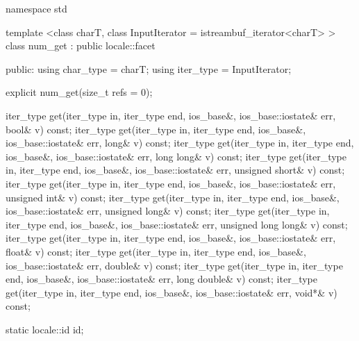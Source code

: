 %
\begin{codeblock}
namespace std {
  template <class charT, class InputIterator = istreambuf_iterator<charT> >
  class num_get : public locale::facet {
  public:
    using char_type = charT;
    using iter_type = InputIterator;

    explicit num_get(size_t refs = 0);

    iter_type get(iter_type in, iter_type end, ios_base&,
                  ios_base::iostate& err, bool& v) const;
    iter_type get(iter_type in, iter_type end, ios_base&,
                  ios_base::iostate& err, long& v) const;
    iter_type get(iter_type in, iter_type end, ios_base&,
                  ios_base::iostate& err, long long& v) const;
    iter_type get(iter_type in, iter_type end, ios_base&,
                  ios_base::iostate& err, unsigned short& v) const;
    iter_type get(iter_type in, iter_type end, ios_base&,
                  ios_base::iostate& err, unsigned int& v) const;
    iter_type get(iter_type in, iter_type end, ios_base&,
                  ios_base::iostate& err, unsigned long& v) const;
    iter_type get(iter_type in, iter_type end, ios_base&,
                  ios_base::iostate& err, unsigned long long& v) const;
    iter_type get(iter_type in, iter_type end, ios_base&,
                  ios_base::iostate& err, float& v) const;
    iter_type get(iter_type in, iter_type end, ios_base&,
                  ios_base::iostate& err, double& v) const;
    iter_type get(iter_type in, iter_type end, ios_base&,
                  ios_base::iostate& err, long double& v) const;
    iter_type get(iter_type in, iter_type end, ios_base&,
                  ios_base::iostate& err, void*& v) const;

    static locale::id id;

}}
\end{codeblock}
